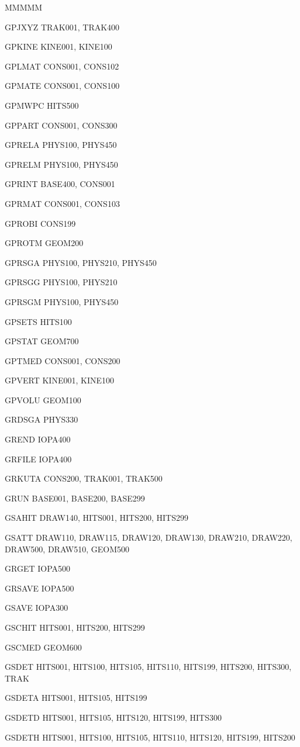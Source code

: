 {\begin{DL}{MMMMM}
\item[GPJXYZ]TRAK001, TRAK400
\item[GPKINE]KINE001, KINE100
\item[GPLMAT]CONS001, CONS102
\item[GPMATE]CONS001, CONS100
\item[GPMWPC]HITS500
\item[GPPART]CONS001, CONS300
\item[GPRELA]PHYS100, PHYS450
\item[GPRELM]PHYS100, PHYS450
\item[GPRINT]BASE400, CONS001
\item[GPRMAT]CONS001, CONS103
\item[GPROBI]CONS199
\item[GPROTM]GEOM200
\item[GPRSGA]PHYS100, PHYS210, PHYS450
\item[GPRSGG]PHYS100, PHYS210
\item[GPRSGM]PHYS100, PHYS450
\item[GPSETS]HITS100
\item[GPSTAT]GEOM700
\item[GPTMED]CONS001, CONS200
\item[GPVERT]KINE001, KINE100
\item[GPVOLU]GEOM100
\item[GRDSGA]PHYS330
\item[GREND ]IOPA400
\item[GRFILE]IOPA400
\item[GRKUTA]CONS200, TRAK001, TRAK500
\item[GRUN  ]BASE001, BASE200, BASE299
\item[GSAHIT]DRAW140, HITS001, HITS200, HITS299
\item[GSATT ]DRAW110, DRAW115, DRAW120, DRAW130, DRAW210, DRAW220,\\
DRAW500, DRAW510, GEOM500
\item[GRGET ]IOPA500
\item[GRSAVE]IOPA500
\item[GSAVE ]IOPA300
\item[GSCHIT]HITS001, HITS200, HITS299
\item[GSCMED]GEOM600
\item[GSDET ]HITS001, HITS100, HITS105, HITS110, HITS199, HITS200, HITS300, TRAK
\item[GSDETA]HITS001, HITS105, HITS199
\item[GSDETD]HITS001, HITS105, HITS120, HITS199, HITS300
\item[GSDETH]HITS001, HITS100, HITS105, HITS110, HITS120, HITS199, HITS200

\end{DL}}
